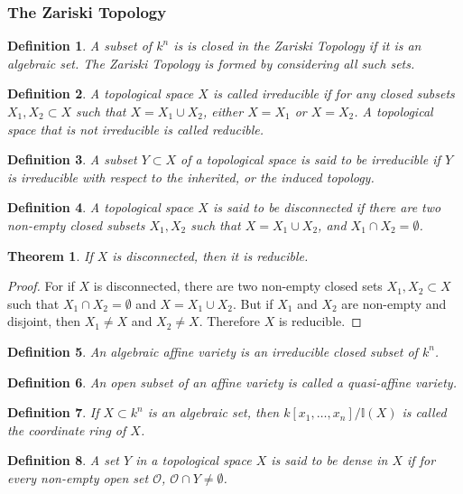 \documentclass[oneside]{book}
\theoremstyle{mystyle}
\newtheorem{theorem}{Theorem}[section]
\newtheorem{definition}{Definition}[section]
\begin{document}
\subsubsection{The Zariski Topology}
\begin{definition}
A subset of $k^n$ is is closed in the Zariski Topology if it is an algebraic set. The Zariski Topology is formed by considering all such sets.
\end{definition}
\begin{definition}
A topological space $X$ is called irreducible if for any closed subsets $X_1,X_2\subset X$ such that $X=X_1\cup X_2$, either $X=X_1$ or $X=X_2$. A topological space that is not irreducible is called reducible.
\end{definition}
\begin{definition}
A subset $Y\subset X$ of a topological space is said to be irreducible if $Y$ is irreducible with respect to the inherited, or the induced topology.
\end{definition}
\begin{definition}
A topological space $X$ is said to be disconnected if there are two non-empty closed subsets $X_1,X_2$ such that $X = X_1\cup X_2$, and $X_1\cap X_2 = \emptyset$.
\end{definition}
\begin{theorem}
If $X$ is disconnected, then it is reducible.
\end{theorem}
\begin{proof}
For if $X$ is disconnected, there are two non-empty closed sets $X_1,X_2\subset X$ such that $X_1\cap X_2 = \emptyset$ and $X = X_1\cup X_2$. But if $X_1$ and $X_2$ are non-empty and disjoint, then $X_1\ne X$ and $X_2 \ne X$. Therefore $X$ is reducible.
\end{proof}
\begin{definition}
An algebraic affine variety is an irreducible closed subset of $k^n$.
\end{definition}
\begin{definition}
An open subset of an affine variety is called a quasi-affine variety.
\end{definition}
\begin{definition}
If $X\subset k^n$ is an algebraic set, then $k[x_1,\hdots ,x_n]/\mathbb{I}(X)$ is called the coordinate ring of $X$.
\end{definition}
\begin{definition}
A set $Y$ in a topological space $X$ is said to be dense in $X$ if for every non-empty open set $\mathcal{O}$, $\mathcal{O}\cap Y\ne \emptyset$.
\end{definition}
\end{document}
